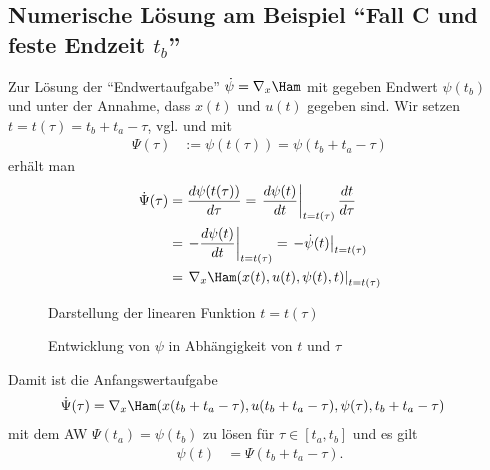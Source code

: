 \subsection{Numerische Lösung am Beispiel "`Fall C und feste Endzeit $t_b$"'}
Zur Lösung der "`Endwertaufgabe"' $\dot{\psi}=\nabla_x \Ham$ mit gegeben Endwert $\psi(t_b)$ und unter der Annahme, dass $x(t)$ und $u(t)$ gegeben
sind. Wir setzen $t=t(\tau)=t_b+t_a-\tau$, vgl.  und mit 
\begin{align*}
	\Psi(\tau) & := \psi(t(\tau)) = \psi(t_b+t_a-\tau)
\end{align*}
erhält man 
\begin{align*}
	\dot{\Psi}(\tau) & = \frac{d\psi(t(\tau))}{d\tau} = \left.\frac{d\psi(t)}{dt}\right|_{t=t(\tau)}\frac{dt}{d\tau}\\
	& = \left.-\frac{d\psi(t)}{dt}\right|_{t=t(\tau)}=\left.-\dot{\psi}(t)\right|_{t=t(\tau)}\\
	& = \left.\nabla_x \Ham(x(t),u(t),\psi(t),t)\right|_{t=t(\tau)}
\end{align*}
\begin{figure}[htb]
	\centering
	
	\caption{Darstellung der linearen Funktion $t=t(\tau)$}
	\label{fig:kap_2_fallc_tbfest_ttau}
\end{figure}
\begin{figure}[htb]
	\centering
	
	\caption{Entwicklung von $\psi$ in Abhängigkeit von $t$ und $\tau$}
	\label{fig:kap_2_fallc_tbfest_psi}
\end{figure}
Damit ist die Anfangswertaufgabe 
\begin{align*}
	\dot{\Psi}(\tau) & = \nabla_x \Ham(x(t_b+t_a-\tau),u(t_b+t_a-\tau),\psi(\tau),t_b+t_a-\tau)
\end{align*}
mit dem \ac{AW} $\Psi(t_a)=\psi(t_b)$ zu lösen für $\tau\in[t_a,t_b]$ und es gilt
\begin{align*}
	\psi(t) & = \Psi(t_b+t_a-\tau).
\end{align*}

